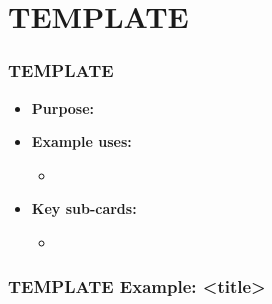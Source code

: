 \section{TEMPLATE}

\begin{frame}\frametitle{TEMPLATE}

\begin{itemize}
\item[] \textbf{Purpose:}
\item[] \textbf{Example uses:}
\begin{itemize}
  \item
\end{itemize}
\item[] \textbf{Key sub-cards:}
\begin{itemize}
  \item[] \verb||
\end{itemize}
\end{itemize}

\end{frame}

\begin{frame}[fragile]\frametitle{TEMPLATE Example: <title>}

\begin{semiverbatim}
\end{semiverbatim}

\end{frame}

